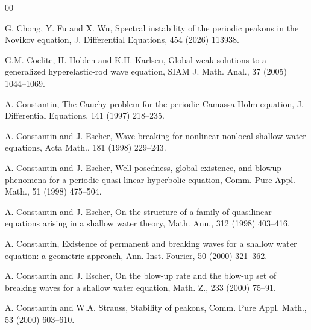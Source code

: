 \documentclass[preprint,12pt]{elsarticle}
\numberwithin{equation}{section}
\begin{document}
\begin{thebibliography}{00}

 G. Chong, Y. Fu and X. Wu, Spectral instability of the periodic peakons in the Novikov equation, J. Differential Equations, 454 (2026) 113938.

 G.M. Coclite, H. Holden and K.H. Karlsen, Global weak solutions to a generalized hyperelastic-rod wave equation, SIAM J. Math. Anal., 37 (2005) 1044--1069.

 A. Constantin, The Cauchy problem for the periodic Camassa-Holm equation, J. Differential Equations, 141 (1997) 218--235.

 A. Constantin and J. Escher, Wave breaking for nonlinear nonlocal shallow water equations, Acta Math., 181 (1998) 229--243.

 A. Constantin and J. Escher, Well-posedness, global existence, and blowup phenomena for a periodic quasi-linear hyperbolic equation, Comm. Pure Appl. Math., 51 (1998) 475--504.

 A. Constantin and J. Escher, On the structure of a family of quasilinear equations arising in a shallow water theory, Math. Ann., 312 (1998) 403--416.




 A. Constantin, Existence of permanent and breaking waves for a shallow water equation: a geometric approach, Ann. Inst. Fourier, 50 (2000) 321--362.

 A. Constantin and J. Escher, On the blow-up rate and the blow-up set of breaking waves for a shallow water equation, Math. Z., 233 (2000) 75--91.

 A. Constantin and W.A. Strauss, Stability of peakons, Comm. Pure Appl. Math., 53 (2000) 603--610.


\end{thebibliography}
\end{document}
